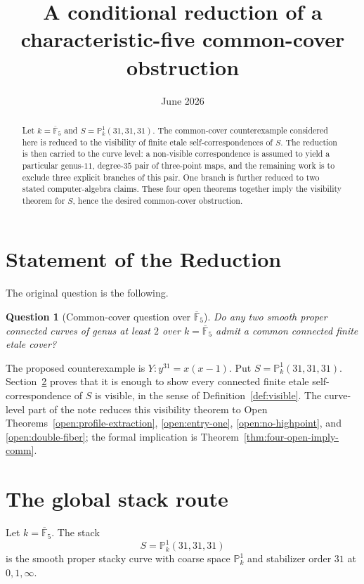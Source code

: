 \documentclass[11pt]{amsart}
\title{A conditional reduction of a characteristic-five common-cover obstruction}
\author{June 2026}
\newtheorem{question}[theorem]{Question}
\newcommand{\kbar}{\overline{\mathbb F}_5}
\newcommand{\PP}{\mathbb P}
\begin{document}
\maketitle

\begin{abstract}
Let \(k=\overline{\mathbb F}_5\) and \(S=\PP^1_k(31,31,31)\).  The common-cover
counterexample considered here is reduced to the visibility of finite etale
self-correspondences of \(S\).  The reduction is then carried to the curve
level: a non-visible correspondence is assumed to yield a particular
genus-\(11\), degree-\(35\) pair of three-point maps, and the remaining work is
to exclude three explicit branches of this pair.  One branch is further
reduced to two stated computer-algebra claims.  These four open theorems
together imply the visibility theorem for \(S\), hence the desired
common-cover obstruction.
\end{abstract}

\tableofcontents

\section{Statement of the Reduction}

The original question is the following.

\begin{question}[Common-cover question over \(\kbar\)]
Do any two smooth proper connected curves of genus at least \(2\) over
\(k=\kbar\) admit a common connected finite etale cover?
\end{question}

The proposed counterexample is \(Y:y^{31}=x(x-1)\).  Put
\(S=\PP^1_k(31,31,31)\).  Section~\ref{sec:global-route} proves that it is
enough to show every connected finite etale self-correspondence of \(S\) is
visible, in the sense of Definition~\ref{def:visible}.  The curve-level part
of the note reduces this visibility theorem to Open
Theorems~\ref{open:profile-extraction}, \ref{open:entry-one},
\ref{open:no-highpoint}, and \ref{open:double-fiber}; the formal implication
is Theorem~\ref{thm:four-open-imply-comm}.

\section{The global stack route}
\label{sec:global-route}

Let \(k=\kbar\).  The stack
\[
  S=\PP^1_k(31,31,31)
\]
is the smooth proper stacky curve with coarse space \(\PP^1_k\) and stabilizer
order \(31\) at \(0,1,\infty\).
\end{document}

